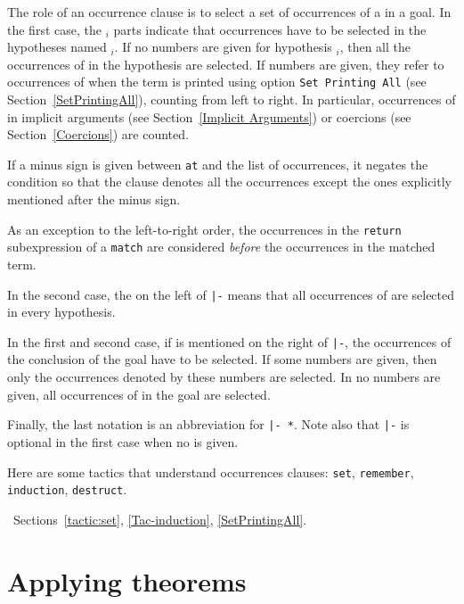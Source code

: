 The role of an occurrence clause is to select a set of occurrences of
a {\term} in a goal. In the first case, the {{\ident$_i$}
} parts
indicate that occurrences have to be selected in the hypotheses named
{\ident$_i$}.  If no numbers are given for hypothesis {\ident$_i$},
then all the occurrences of {\term} in the hypothesis are selected. If
numbers are given, they refer to occurrences of {\term} when the term
is printed using option {\tt Set Printing All} (see
Section~\ref{SetPrintingAll}), counting from left to right. In
particular, occurrences of {\term} in implicit arguments (see
Section~\ref{Implicit Arguments}) or coercions (see
Section~\ref{Coercions}) are counted.

If a minus sign is given between {\tt at} and the list of occurrences,
it negates the condition so that the clause denotes all the occurrences except
the ones explicitly mentioned after the minus sign.

As an exception to the left-to-right order, the occurrences in the
{\tt return} subexpression of a {\tt match} are considered {\em
before} the occurrences in the matched term.

In the second case, the {\tt *} on the left of {\tt |-} means that
all occurrences of {\term} are selected in every hypothesis.

In the first and second case, if {\tt *} is mentioned on the right of
{\tt |-}, the occurrences of the conclusion of the goal have to be
selected. If some numbers are given, then only the occurrences denoted
by these numbers are selected. In no numbers are given, all
occurrences of {\term} in the goal are selected.

Finally, the last notation is an abbreviation for {\tt * |- *}. Note
also that {\tt |-} is optional in the first case when no {\tt *} is
given.

Here are some tactics that understand occurrences clauses:
{\tt set}, {\tt remember}, {\tt induction}, {\tt destruct}.

\SeeAlso~Sections~\ref{tactic:set}, \ref{Tac-induction}, \ref{SetPrintingAll}.

\section{Applying theorems}

\subsection{}
\label{exact}

